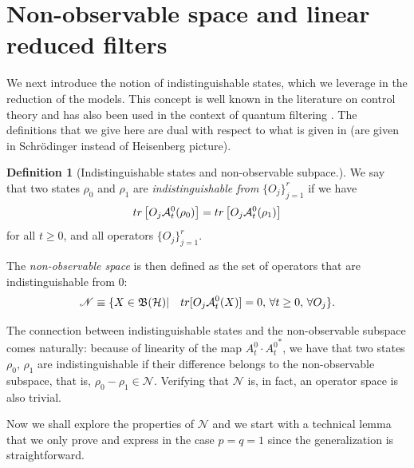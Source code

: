 \documentclass[aihp,12pt]{imsart}
\newcommand{\Hc}{\mathcal{H}}
\newcommand{\Ns}{\mathscr{N}}
\newcommand{\Bf}{\mathfrak{B}}
\newcommand{\tr}{{\rm tr}}
\theoremstyle{theorem}
\theoremstyle{definition}
\newtheorem{definition}{Definition}
\theoremstyle{remark}
\begin{document}
\section{Non-observable space and linear reduced filters}
\label{sec:observable_space}

We next introduce the notion of indistinguishable states, which we leverage in the reduction of the models. This concept is well known in the literature on control theory \cite{kalman,kalman1969topics,wonham,marrobasile} and has also been used in the context of quantum filtering \cite{vanhandel2008stabilityquantummarkovfilters}. The definitions that we give here are dual with respect to what is given in \cite{vanhandel2008stabilityquantummarkovfilters} (are given in Schr\"{o}dinger instead of Heisenberg picture).
\begin{definition}[Indistinguishable states and non-observable subpace.]
    We say that two states $\rho_0$ and $\rho_1$ are \textit{indistinguishable from} $\{O_j\}_{j=1}^r$ if we have 
    \begin{equation}
        \tr\left[O_j \mathcal A_t^0(\rho_0)\right] = \tr\left[O_j \mathcal A_t^0(\rho_1) \right]
    \end{equation}
    for all $t\geq0$, and all operators $\{O_j\}_{j=1}^r$.
    
    \noindent The {\em non-observable space} is then defined as the set of operators that are indistinguishable from 0:
    \begin{equation}
        \Ns \equiv\{X\in\Bf(\Hc)|\quad \tr[O_j \mathcal A_t^0 (X)] = 0,\, \forall t\geq0, \, \forall O_j\}.
        \label{eq:non_observable_definition}
    \end{equation}
\end{definition}


The connection between indistinguishable states and the non-observable subspace comes naturally: because of linearity of the map $A_t^0 \cdot {A_t^0}^*$, we have that two states $\rho_0,\,\rho_1$ are indistinguishable if their difference belongs to the non-observable subspace, that is, $\rho_0-\rho_1\in\Ns$. Verifying that $\Ns$ is, in fact, an operator space is also trivial.

Now we shall explore the properties of $\mathcal N$ and we start with a technical lemma that we only prove and express in the case $p=q=1$ since the generalization is straightforward.
\end{document}
